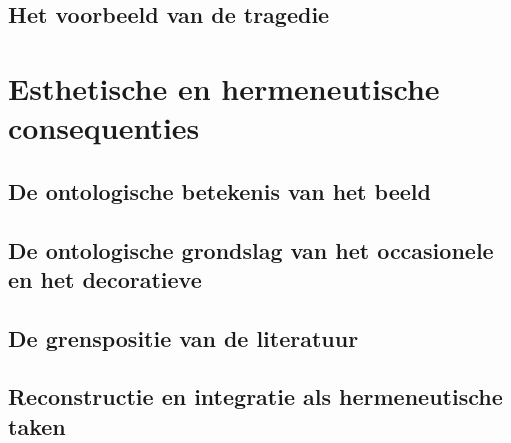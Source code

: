 \subsection{Het voorbeeld van de tragedie}

\section{Esthetische en hermeneutische consequenties}

\subsection{De ontologische betekenis van het beeld}

\subsection{De ontologische grondslag van het occasionele en het decoratieve}

\subsection{De grenspositie van de literatuur}

\subsection{Reconstructie en integratie als hermeneutische taken}

